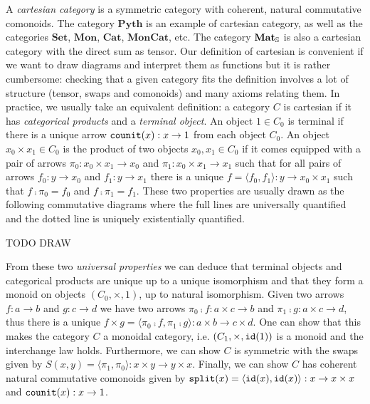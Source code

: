 A \emph{cartesian category} is a symmetric category with coherent, natural commutative comonoids.
The category $\mathbf{Pyth}$ is an example of cartesian category, as well as the categories $\mathbf{Set}$, $\mathbf{Mon}$, $\mathbf{Cat}$, $\mathbf{MonCat}$, etc.
The category $\mathbf{Mat}_\S$ is also a cartesian category with the direct sum as tensor.
Our definition of cartesian is convenient if we want to draw diagrams and interpret them as functions but it is rather cumbersome: checking that a given category fits the definition involves a lot of structure (tensor, swaps and comonoids) and many axioms relating them.
In practice, we usually take an equivalent definition: a category $C$ is cartesian if it has \emph{categorical products} and a \emph{terminal object}.
An object $1 \in C_0$ is terminal if there is a unique arrow $\counit(x) : x \to 1$ from each object $C_0$.
An object $x_0 \times x_1 \in C_0$ is the product of two objects $x_0, x_1 \in C_0$ if it comes equipped with a pair of arrows $\pi_0 : x_0 \times x_1 \to x_0$ and $\pi_1 : x_0 \times x_1 \to x_1$
such that for all pairs of arrows $f_0 : y \to x_0$ and $f_1 : y \to x_1$ there is a unique $f = \langle f_0, f_1 \rangle : y \to x_0 \times x_1$ such that $f \fcmp \pi_0 = f_0$ and $f \fcmp \pi_1 = f_1$.
These two properties are usually drawn as the following commutative diagrams where the full lines are universally quantified and the dotted line is uniquely existentially quantified.

TODO DRAW

From these two \emph{universal properties} we can deduce that terminal objects and categorical products are unique up to a unique isomorphism and that they form a monoid on objects $(C_0, \times, 1)$, up to natural isomorphism.
Given two arrows $f : a \to b$ and $g : c \to d$ we have two arrows $\pi_0 \fcmp f : a \times c \to b$ and $\pi_1 \fcmp g : a \times c \to d$, thus there is a unique $f \times  g = \langle \pi_0 \fcmp f, \pi_1 \fcmp g \rangle : a \times b \to c \times d$.
One can show that this makes the category $C$ a monoidal category, i.e. $(C_1, \times, \id(1))$ is a monoid and the interchange law holds.
Furthermore, we can show $C$ is symmetric with the swaps given by $S(x, y) = \langle \pi_1, \pi_0 \rangle : x \times y \to y \times x$.
Finally, we can show $C$ has coherent natural commutative comonoids given by $\ttsplit(x) = \langle \id(x), \id(x) \rangle : x \to x \times x$ and $\counit(x) : x \to 1$.


